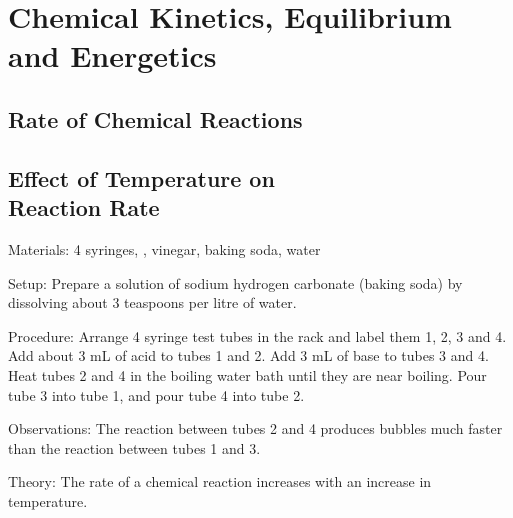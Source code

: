 \section{Chemical Kinetics, Equilibrium and Energetics} 

\begin{multicols}{2}


\section*{Rate of Chemical Reactions} 


\subsection{Effect of Temperature on \hfill \\ Reaction Rate} 


\begin{description*}
\item[Materials:]{4 syringes, , vinegar, baking soda, water }
\item[Setup:]{Prepare a solution of sodium hydrogen carbonate (baking soda) by dissolving about 3 teaspoons per litre of water.}
\item[Procedure:]{Arrange 4 syringe test tubes in the rack and label them 1, 2, 3 and 4. Add about 3 mL of acid to tubes 1 and 2. Add 3 mL of base to tubes 3 and 4. Heat tubes 2 and 4 in the boiling water bath until they are near boiling. Pour tube 3 into tube 1, and pour tube 4 into tube 2.}
\item[Observations:]{The reaction between tubes 2 and 4 produces bubbles much faster than the reaction between tubes 1 and 3.}
\item[Theory:]{The rate of a chemical reaction increases with an increase in temperature.}
\end{description*}


\end{multicols}
